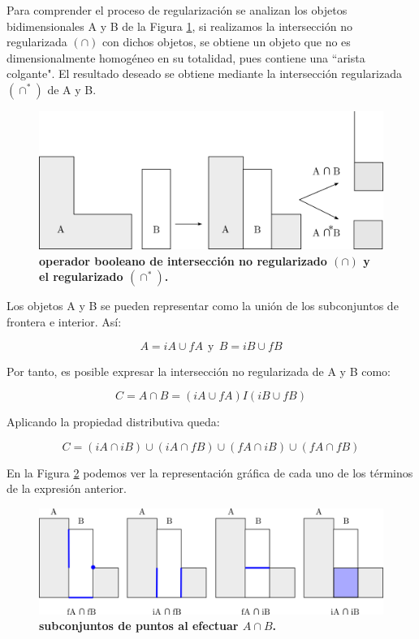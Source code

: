 Para comprender el proceso de regularización se analizan los objetos bidimensionales A y B de la Figura \ref{fig:booleano2}, si realizamos la intersección no regularizada $(\cap)$ con dichos objetos, se obtiene un objeto que no es dimensionalmente homogéneo en su totalidad, pues contiene una ``arista colgante". El resultado deseado se obtiene mediante la intersección regularizada $(\cap^*)$ de A y B.


\begin{figure}[h]
\includegraphics[width=12cm]{Img/GEO/geo-booleano3.jpg}
\centering
\caption{\textbf{ \footnotesize{operador booleano de intersección no regularizado $(\cap)$ y el regularizado $(\cap^*)$.}}}
\label{fig:booleano2}
\end{figure}




Los objetos A y B se pueden representar como la unión de los subconjuntos de frontera e interior. Así:

\begin{equation}
   A = iA \cup fA \ \ \text{y} \ \ B = iB \cup fB
\end{equation}

Por tanto, es posible expresar la intersección no regularizada de A y B como:

\begin{equation}
C = A \cap B = (iA \cup fA) I (iB \cup fB)
\end{equation}

Aplicando la propiedad distributiva queda:

\begin{equation}
\label{eq:booleano0}
C = (iA \cap iB) \cup (iA \cap fB) \cup (fA \cap iB) \cup (fA \cap fB)
\end{equation}

En la Figura \ref{fig:booleano3} podemos ver la representación gráfica de cada uno de los términos de la expresión anterior.

\begin{figure}[h]
\includegraphics[width=14cm]{Img/GEO/geo-booleano4.png}
\centering
\caption{\textbf{\footnotesize{subconjuntos de puntos al efectuar $A \cap B$.}}}
\label{fig:booleano3}
\end{figure}

